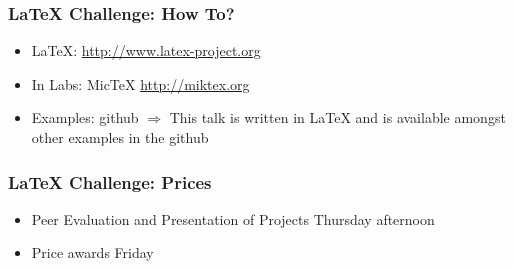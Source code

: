 \documentclass{beamer}
\begin{document}
\begin{frame}
\frametitle{LaTeX Challenge: How To?}
\begin{itemize}
\item LaTeX: \url{http://www.latex-project.org}
\item In Labs: MicTeX \url{http://miktex.org}
\item Examples: github \alert{$\Rightarrow$} This talk is written in LaTeX
      and is available amongst other examples in the github
\end{itemize}
\end{frame}

\begin{frame}
\frametitle{LaTeX Challenge: Prices}
\begin{itemize}
\item Peer Evaluation and Presentation of Projects Thursday afternoon
\item Price awards Friday
\end{itemize}
\end{frame}
\end{document}
